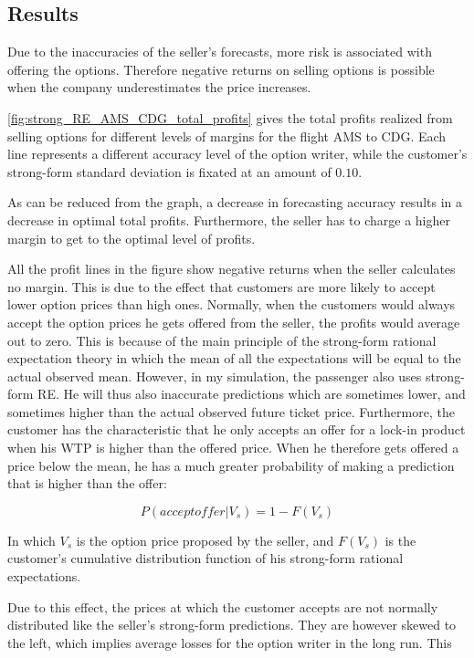 

\subsection{Results}
Due to the inaccuracies of the seller's forecasts, more risk is associated with offering the options. Therefore negative returns on selling options is possible when the company underestimates the price increases.

\autoref{fig:strong_RE_AMS_CDG_total_profits} gives the total profits realized from selling options for different levels of margins for the flight AMS to CDG. Each line represents a different accuracy level of the option writer, while the customer's strong-form standard deviation is fixated at an amount of $0.10$.

As can be reduced from the graph, a decrease in forecasting accuracy results in a decrease in optimal total profits. Furthermore, the seller has to charge a higher margin to get to the optimal level of profits.

All the profit lines in the figure show negative returns when the seller calculates no margin. This is due to the effect that customers are more likely to accept lower option prices than high ones. Normally, when the customers would always accept the option prices he gets offered from the seller, the profits would average out to zero. This is because of the main principle of the strong-form rational expectation theory in which the mean of all the expectations will be equal to the actual observed mean. However, in my simulation, the passenger also uses strong-form RE. He will thus also inaccurate predictions which are sometimes lower, and sometimes higher than the actual observed future ticket price. Furthermore, the customer has the characteristic that he only accepts an offer for a lock-in product when his WTP is higher than the offered price. When he therefore gets offered a price below the mean, he has a much greater probability of making a prediction that is higher than the offer:

$$ P(accept offer | V_s)  = 1 - F(V_s)  $$

In which $V_s$ is the option price proposed by the seller, and $F(V_s)$ is the customer's cumulative distribution function of his strong-form rational expectations.

Due to this effect, the prices at which the customer accepts are not normally distributed like the seller's strong-form predictions. They are however skewed to the left, which implies average losses for the option writer in the long run. This

